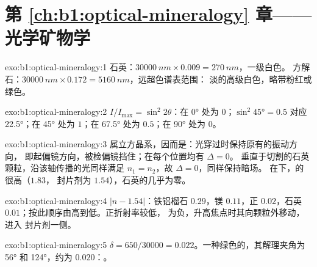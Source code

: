 \section*{第 \ref{ch:b1:optical-mineralogy} 章——光学矿物学}

\begin{solution}{exo:b1:optical-mineralogy:1}
石英：$\qty{30000}{nm}\times0.009 = \qty{270}{nm}$，一级白色。
方解石：$\qty{30000}{nm}\times0.172 = \qty{5160}{nm}$，远超色谱表范围：
淡的高级白色，略带粉红或绿色。
\end{solution}

\begin{solution}{exo:b1:optical-mineralogy:2}
$I/I_{\max} = \sin^2 2\theta$：在 \ang{0} 处为 $0$；$\sin^2\ang{45} = 0.5$ 对应
\ang{22.5}；在 \ang{45} 处为 $1$；在 \ang{67.5} 处为 $0.5$；在 \ang{90} 处为 $0$。
\end{solution}

\begin{solution}{exo:b1:optical-mineralogy:3}
属立方晶系，因而是：光穿过时保持原有的振动方向，
即起偏镜方向，被检偏镜挡住；在每个位置均有 $\Delta = 0$。
垂直于切割的石英颗粒，沿该轴传播的光同样满足
$n_1 = n_2$，故 $\Delta = 0$，同样保持暗场。
在下，的很高（$1.83$，
封片剂为 $1.54$），石英的几乎为零。
\end{solution}

\begin{solution}{exo:b1:optical-mineralogy:4}
$|n - 1.54|$：铁铝榴石 $0.29$，镁 $0.11$，正 $0.02$，石英
$0.01$；按此顺序由高到低。正折射率较低，
为负，升高焦点时其向颗粒外移动，进入
封片剂一侧。
\end{solution}

\begin{solution}{exo:b1:optical-mineralogy:5}
$\delta = 650/30000 = 0.022$。一种绿色的，其解理夹角为
\ang{56} 和 \ang{124}，约为 $0.020$：。
\end{solution}

